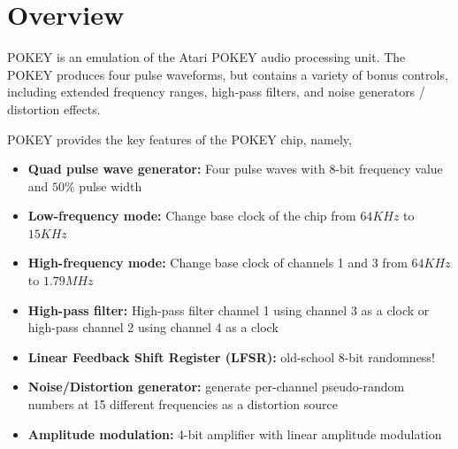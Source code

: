 \documentclass[12pt,a4paper]{article}
\begin{document}

\section{Overview}

POKEY is an emulation of the Atari POKEY audio processing unit. The POKEY
produces four pulse waveforms, but contains a variety of bonus controls,
including extended frequency ranges, high-pass filters, and noise generators /
distortion effects.

POKEY provides the key features of the POKEY chip, namely,
\begin{itemize}
  \item \textbf{Quad pulse wave generator:} Four pulse waves with 8-bit frequency value and $50\%$ pulse width
  \item \textbf{Low-frequency mode:} Change base clock of the chip from $64 KHz$ to $15 KHz$
  \item \textbf{High-frequency mode:} Change base clock of channels 1 and 3 from $64 KHz$ to $1.79 MHz$
  \item \textbf{High-pass filter:} High-pass filter channel 1 using channel 3 as a clock or high-pass channel 2 using channel 4 as a clock
  \item \textbf{Linear Feedback Shift Register (LFSR):} old-school 8-bit randomness!
  \item \textbf{Noise/Distortion generator:} generate per-channel pseudo-random numbers at 15 different frequencies as a distortion source
  \item \textbf{Amplitude modulation:} 4-bit amplifier with linear amplitude modulation
\end{itemize}


\clearpage
\end{document}
